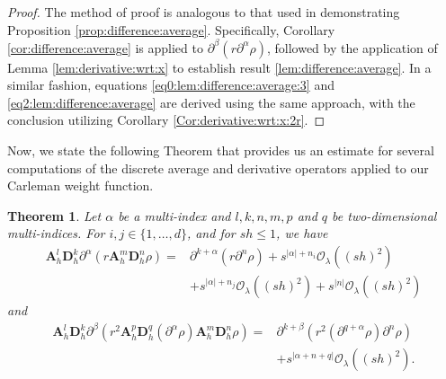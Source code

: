 \documentclass[11pt,oneside,leqno]{amsart}
\numberwithin{equation}{section}
\numberwithin{equation}{section}
\newtheorem{theorem}{Theorem}[section]
\begin{document}
\begin{proof} The method of proof is analogous to that used in demonstrating Proposition \ref{prop:difference:average}. Specifically, Corollary \ref{cor:difference:average} is applied to $\partial^{\beta}(r\partial^{\alpha}\rho)$, followed by the application of Lemma \ref{lem:derivative:wrt:x} to establish result \eqref{lem:difference:average}. In a similar fashion, equations \eqref{eq0:lem:difference:average:3} and \eqref{eq2:lem:difference:average} are derived using the same approach, with the conclusion utilizing Corollary \ref{Cor:derivative:wrt:x:2r}.
\end{proof}
Now, we state the following Theorem that provides us an estimate for several computations of the discrete average and derivative operators applied to our Carleman weight function. 
\begin{theorem}\label{theo:weight:estimates}
Let $\alpha$ be a multi-index and $l,k,n,m,p$ and $q$ be two-dimensional multi-indices. For $i,j\in\{ 1,\ldots, d\}$, and for $sh\leq 1$, we have
\begin{equation}\label{eq1:theo:weight:estimates}
\begin{aligned}
       \mathbf{A}_{h}^{l}\mathbf{D}_{h}^{k}\partial^{\alpha}(r\mathbf{A}_{h}^{m}\mathbf{D}_{h}^{n}\rho)=&\partial^{k+\alpha}(r\partial^{n}\rho)+s^{|\alpha|+n_{i}}\mathcal{O}_{\lambda}((sh)^{2})\\
       &+s^{|\alpha|+n_{j}}\mathcal{O}_{\lambda}((sh)^{2})+s^{|n|}\mathcal{O}_{\lambda}((sh)^{2})
\end{aligned}       
\end{equation}
and 
\begin{equation}\label{eq2:theo:weight:estimates}
\begin{aligned}
\mathbf{A}_{h}^{l}\mathbf{D}_{h}^{k}\partial^{\beta}(r^{2}\mathbf{A}^{p}_{h}\mathbf{D}^{q}_{h}(\partial^{\alpha}\rho)\mathbf{A}_{h}^{m}\mathbf{D}_{h}^{n}\rho)=&\partial^{k+\beta}(r^{2}(\partial^{q+\alpha}\rho)\partial^{n}\rho)\\
&+s^{|\alpha+n+q|}\mathcal{O}_{\lambda}((sh)^{2}).
\end{aligned}
\end{equation}
\end{theorem}
\end{document}
